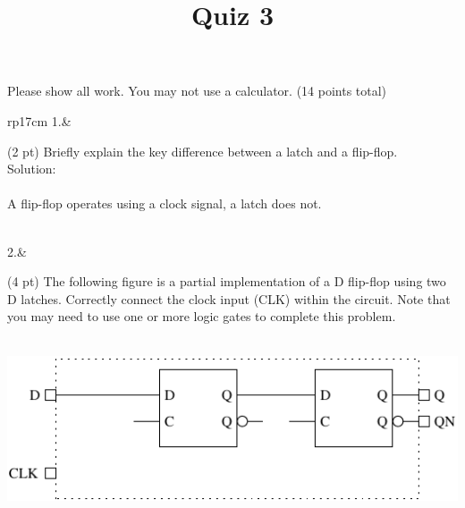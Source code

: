 \documentclass{article}
\title{Quiz 3}
\date{}
\begin{document}
\maketitle
Please show all work.  You may not use a calculator. (14 points total)
\begin{longtable}[l]{rp{17cm}}
1.&\begin{minipage}[t]{\linewidth}(2 pt) Briefly explain the key difference between a latch and a flip-flop. \\

Solution: \\ \\
A flip-flop operates using a clock signal, a latch does not. \\
\end{minipage}\\
\medskip
2.&\begin{minipage}[t]{\linewidth}(4 pt) The following figure is a partial implementation of a D flip-flop using two D latches.  Correctly connect the clock input (CLK) within the circuit.  Note that you may need to use one or more logic gates to complete this problem. \\ \\
\begin{center}
  \includegraphics{../LatchesAndFlipFlops/Assessments/DFlipFlopLogicNoClock}
\end{center}


\end{minipage}
\end{longtable}
\end{document}
